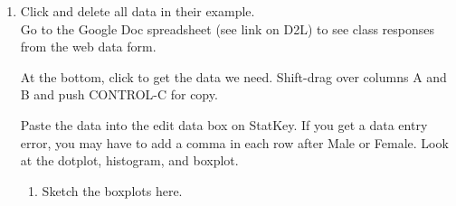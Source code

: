 \begin{enumerate}
\begin{enumerate}
\begin{key}
  {\it No. mean Bp of those who dies was 119, of those who lived, 136.
   Medians are even closer, 126 to 132.}
\end{key}


  \item Are the spreads similar? 
\begin{students}
    \vspace{2cm}    
\end{students}

\begin{key}
  {\it No, SD estimate is 30 for lived, 41 for those who died. IQR is
    44 for the lived group, 52 for those who died. }
\end{key}

  \item Are the distributions symmetric or skewed?
\begin{students}
    \vspace{2cm}    
\end{students}

\begin{key}
  {\it I'd say symmetric, but long tailed.}
\end{key}
  \end{enumerate}


  \begin{center}
    {\bf Comparing Wait Times}
  \end{center}
\item  Click  and delete all data in their example.  \\
    Go to the Google Doc spreadsheet (see link on D2L)  to see class
    responses from the  web data form.%

    At the bottom, click  to get the data we need.
    Shift-drag over columns A and B and push CONTROL-C for copy. 

    Paste the data into the edit data box on StatKey.  If you get a
    data entry error, you may have to add a comma in each row after
    Male or Female.  Look at the dotplot, histogram, and
    boxplot.
    \begin{enumerate}
    \item  Sketch the boxplots here.
\begin{students}
    \vspace{2cm}    
\end{students}


\end{enumerate}
\end{enumerate}
